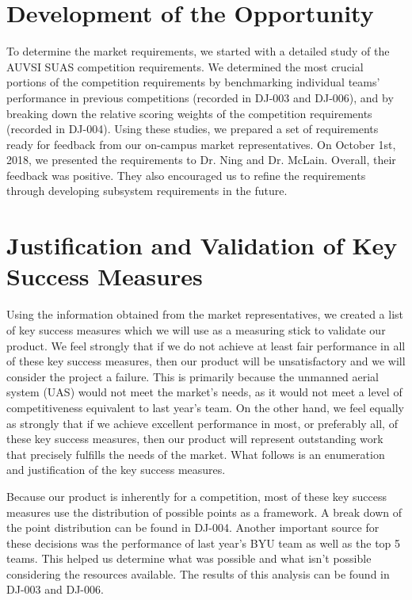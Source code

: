 \documentclass[]{auvsi_doc}
\begin{document}
\section{Development of the Opportunity}

To determine the market requirements, we started with a detailed study of the AUVSI SUAS competition requirements.
We determined the most crucial portions of the competition requirements by benchmarking individual teams' performance in previous competitions (recorded in DJ-003 and DJ-006), and by breaking down the relative scoring weights of the competition requirements (recorded in DJ-004). 
Using these studies, we prepared a set of requirements ready for feedback from our on-campus market representatives.
On October 1st, 2018, we presented the requirements to Dr. Ning and Dr. McLain.
Overall, their feedback was positive. They also encouraged us to refine the requirements through developing subsystem requirements in the future.

\section{Justification and Validation of Key Success Measures}
Using the information obtained from the market representatives, we created a list of key success measures which we will use as a measuring stick to validate our product. We feel strongly that if we do not achieve at least fair performance in all of these key success measures, then our product will be unsatisfactory and we will consider the project a failure. This is primarily because the unmanned aerial system (UAS) would not meet the market's needs, as it would not meet a level of competitiveness equivalent to last year's team. On the other hand, we feel equally as strongly that if we achieve excellent performance in most, or preferably all, of these key success measures, then our product will represent outstanding work that precisely fulfills the needs of the market. What follows is an enumeration and justification of the key success measures. 

Because our product is inherently for a competition, most of these key success measures use the distribution of possible points as a framework. A break down of the point distribution can be found in DJ-004. Another important source for these decisions was the performance of last year's BYU team as well as the top 5 teams. This helped us determine what was possible and what isn't possible considering the resources available. The results of this analysis can be found in DJ-003 and DJ-006.
\end{document}
